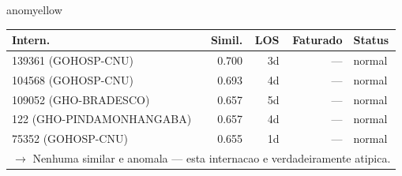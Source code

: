 \documentclass[a4paper,10pt]{article}
\begin{document}
\begin{anomalycard}[Internacao 3419 | GHO-PETROBRAS | MODERADO (z=2.21)]{anomyellow}
\begin{tabular}{l r r r l}\toprule\textbf{Intern.} & \textbf{Simil.} & \textbf{LOS} & \textbf{Faturado} & \textbf{Status} \\\midrule
139361 (GOHOSP-CNU) & 0.700 & 3d & --- & \textcolor{jcubeblue}{normal} \\
104568 (GOHOSP-CNU) & 0.693 & 4d & --- & \textcolor{jcubeblue}{normal} \\
109052 (GHO-BRADESCO) & 0.657 & 5d & --- & \textcolor{jcubeblue}{normal} \\
122 (GHO-PINDAMONHANGABA) & 0.657 & 4d & --- & \textcolor{jcubeblue}{normal} \\
75352 (GOHOSP-CNU) & 0.655 & 1d & --- & \textcolor{jcubeblue}{normal} \\
\multicolumn{5}{l}{\textcolor{jcubeblue}{\small $\rightarrow$ Nenhuma similar e anomala --- esta internacao e verdadeiramente atipica.}} \\
\bottomrule\end{tabular}


\end{anomalycard}

\newpage
\end{document}
